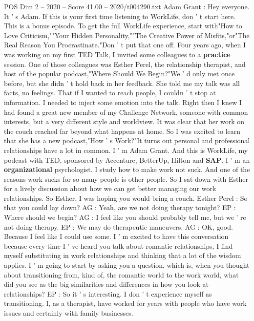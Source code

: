 \begin{textsample}{POS Dim 2 – 2020 – Score 41.00 – 2020/t004290.txt}  \label{ex:f2_pos_010}
Adam Grant : Hey everyone.
It ' s Adam.
If this is your first time listening to WorkLife, don ' t start here.
This is a bonus episode.
To get the full WorkLife experience, start with"How to Love Criticism,""Your Hidden Personality,""The Creative Power of Misfits,"or"The Real Reason You Procrastinate."Don ' t put that one off.
Four years ago, when I was working on my first TED Talk, I invited some colleagues to a \textbf{practice} session.
One of those colleagues was Esther Perel, the relationship therapist, and host of the popular podcast,"Where Should We Begin?"We ' d only met once before, but she didn ' t hold back in her feedback.
She told me my talk was all facts, no feelings.
That if I wanted to reach people, I couldn ' t stop at information.
I needed to inject some emotion into the talk.
Right then I knew I had found a great new member of my Challenge Network, someone with common interests, but a very different style and worldview.
It was clear that her work on the couch reached far beyond what happens at home.
So I was excited to learn that she has a new podcast,"How ' s Work?"It turns out personal and professional relationships have a lot in common.
I ' m Adam Grant.
And this is WorkLife, my podcast with TED, sponsored by Accenture, BetterUp, Hilton and \textbf{SAP}.
I ' m an \textbf{organizational} psychologist.
I study how to make work not suck.
And one of the reasons work sucks for so many people is other people.
So I sat down with Esther for a lively discussion about how we can get better managing our work relationships.
So Esther, I was hoping you would bring a couch.
Esther Perel : So that you could lay down?
AG : Yeah, are we not doing therapy tonight?
EP : Where should we begin?
AG : I feel like you should probably tell me, but we ' re not doing therapy.
EP : We may do therapeutic maneuvers.
AG : OK, good.
Because I feel like I could use some.
I ' m excited to have this conversation because every time I ' ve heard you talk about romantic relationships, I find myself substituting in work relationships and thinking that a lot of the wisdom applies.
I ' m going to start by asking you a question, which is, when you thought about transitioning from, kind of, the romantic world to the work world, what did you see as the big similarities and differences in how you look at relationships?
EP : So it ' s interesting.
I don ' t experience myself as transitioning.
I, as a therapist, have worked for years with people who have work issues and certainly with family businesses.

\end{textsample}
